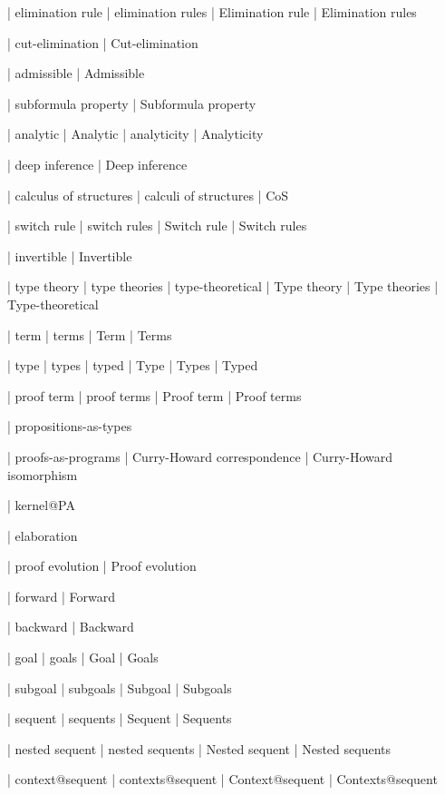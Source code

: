  | elimination rule
 | elimination rules
 | Elimination rule
 | Elimination rules

 | cut-elimination
 | Cut-elimination

 | admissible
 | Admissible

 | subformula property
 | Subformula property

 | analytic
 | Analytic
 | analyticity
 | Analyticity

 | deep inference
 | Deep inference

 | calculus of structures
 | calculi of structures
 | CoS
 
 | switch rule
 | switch rules
 | Switch rule
 | Switch rules

 | invertible
 | Invertible

 | type theory
 | type theories
 | type-theoretical
 | Type theory
 | Type theories
 | Type-theoretical

 | term
 | terms
 | Term
 | Terms

 | type
 | types
 | typed
 | Type
 | Types
 | Typed

 | proof term
 | proof terms
 | Proof term
 | Proof terms

 | propositions-as-types

 | proofs-as-programs
 | Curry-Howard correspondence
 | Curry-Howard isomorphism

 | kernel@PA

 | elaboration

 | proof evolution
 | Proof evolution

 | forward
 | Forward

 | backward
 | Backward
 
 | goal
 | goals
 | Goal
 | Goals

 | subgoal
 | subgoals
 | Subgoal
 | Subgoals

 | sequent
 | sequents
 | Sequent
 | Sequents

 | nested sequent
 | nested sequents
 | Nested sequent
 | Nested sequents

 | context@sequent
 | contexts@sequent
 | Context@sequent
 | Contexts@sequent

